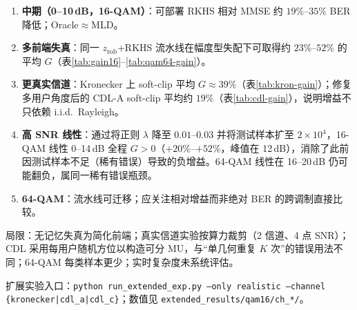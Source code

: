 \begin{enumerate}[leftmargin=2em]
  \item \textbf{中期（0--10\,dB，16-QAM）}：可部署 RKHS 相对 MMSE 约 $19\%$--$35\%$ BER 降低；Oracle$\approx$MLD。
  \item \textbf{多前端失真}：同一 $z_{\mathrm{rob}}$+RKHS 流水线在幅度型失配下可取得约 $23\%$--$52\%$ 的平均 $G$（表\ref{tab:gain16}--\ref{tab:qam64-gain}）。
  \item \textbf{更真实信道}：Kronecker 上 soft-clip 平均 $G\approx 39\%$（表\ref{tab:kron-gain}）；修复多用户角度后的 CDL-A soft-clip 平均约 $19\%$（表\ref{tab:cdl-gain}），说明增益不只依赖 i.i.d.\ Rayleigh。
  \item \textbf{高 SNR 线性}：通过将正则 $\lambda$ 降至 $0.01$--$0.03$ 并将测试样本扩至 $2\times10^{4}$，16-QAM 线性 0--14\,dB 全程 $G>0$（$+20\%$--$+52\%$，峰值在 12\,dB），消除了此前因测试样本不足（稀有错误）导致的负增益。64-QAM 线性在 16--20\,dB 仍可能翻负，属同一稀有错误瓶颈。
  \item \textbf{64-QAM}：流水线可迁移；应关注相对增益而非绝对 BER 的跨调制直接比较。
\end{enumerate}

局限：无记忆失真为简化前端；真实信道实验按算力裁剪（2 信道、4 点 SNR）；CDL 采用每用户随机方位以构造可分 MU，与“单几何重复 $K$ 次”的错误用法不同；64-QAM 每类样本更少；实时复杂度未系统评估。

扩展实验入口：\texttt{python run\_extended\_exp.py --only realistic --channel \{kronecker|cdl\_a|cdl\_c\}}；数值见 \texttt{extended\_results/qam16/ch\_*/}。
